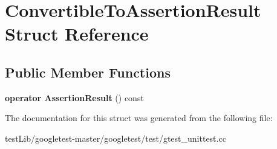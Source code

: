 \hypertarget{structConvertibleToAssertionResult}{}\section{Convertible\+To\+Assertion\+Result Struct Reference}
\label{structConvertibleToAssertionResult}
\subsection*{Public Member Functions}
\begin{DoxyCompactItemize}
\item 
\mbox{\label{structConvertibleToAssertionResult_a0f816f2f25ecaf29a95b3cfd4033e105}} 
{\bfseries operator Assertion\+Result} () const
\end{DoxyCompactItemize}


The documentation for this struct was generated from the following file\+:\begin{DoxyCompactItemize}
\item 
test\+Lib/googletest-\/master/googletest/test/gtest\+\_\+unittest.\+cc\end{DoxyCompactItemize}
